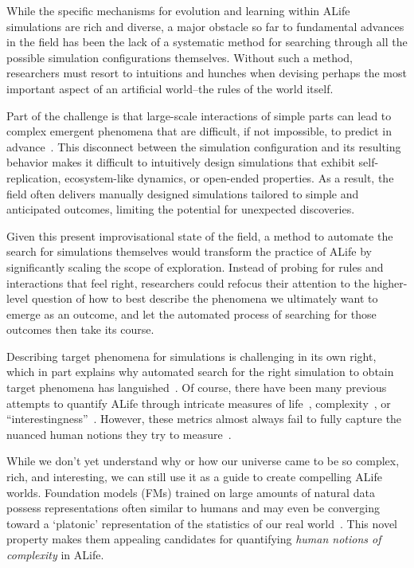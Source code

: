 \documentclass{article}
\begin{document}
While the specific mechanisms for evolution and learning within ALife simulations are rich and diverse, a major obstacle so far to fundamental advances in the field has been the lack of a systematic method for searching through all the possible simulation configurations themselves.
Without such a method, researchers must resort to intuitions and hunches when devising perhaps the most important aspect of an artificial world--the rules of the world itself.

Part of the challenge is that large-scale interactions of simple parts can lead to complex emergent phenomena that are difficult, if not impossible, to predict in advance~\citep{anderson1972more, wolfram2003new}.
This disconnect between the simulation configuration and its resulting behavior makes it difficult to intuitively design simulations that exhibit self-replication, ecosystem-like dynamics, or open-ended properties.
As a result, the field often delivers manually designed simulations tailored to simple and anticipated outcomes, limiting the potential for unexpected discoveries.

Given this present improvisational state of the field, a method to automate the search for simulations themselves would transform the practice of ALife by significantly scaling the scope of exploration.
Instead of probing for rules and interactions that feel right, researchers could refocus their attention to the higher-level question of how to best describe the phenomena we ultimately want to emerge as an outcome, and let the automated process of searching for those outcomes then take its course.


Describing target phenomena for simulations is challenging in its own right, which in part explains why automated search for the right simulation to obtain target phenomena has languished~\citep{stepney2024open, stanley2015greatness}.
Of course, there have been many previous attempts to quantify ALife through intricate measures of life~\citep{sharma2023assembly}, complexity~\citep{mota2013sophistication, lloyd2001measures}, or ``interestingness''~\citep{schmidhuber1997interesting, pathak2017curiosity, secretan2011picbreeder}.
However, these metrics almost always fail to fully capture the nuanced human notions they try to measure~\citep{lloyd2001measures, karwowski2023goodhart}.


While we don't yet understand why or how our universe came to be so complex, rich, and interesting, we can still use it as a guide to create compelling ALife worlds.
Foundation models (FMs) trained on large amounts of natural data possess representations often similar to humans \citep{zhang2018unreasonable, fu2023dreamsim, zhang2023omni} and may even be converging toward a `platonic' representation of the statistics of our real world~\citep{huh2024platonic}.
This novel property makes them appealing candidates for quantifying \textit{human notions of complexity} in ALife.
\end{document}
